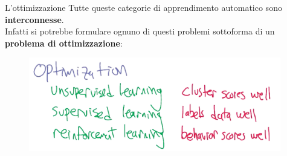 {\begin{frame}
		\begin{block}{L'ottimizzazione}
				Tutte queste categorie di apprendimento automatico sono \textbf{interconnesse}.\\
				Infatti si potrebbe formulare ognuno di questi problemi sottoforma di un \textbf{problema di ottimizzazione}:
				\begin{figure}[!htbp]
					\centering
					\includegraphics[width=11cm]{images/glossary/optimization.png}
				\end{figure}
		\end{block}
	
	\end{frame}
}